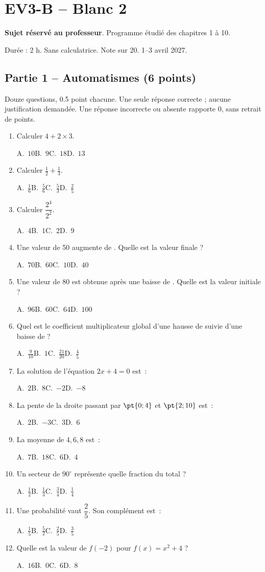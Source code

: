 \mxnewpage\section*{EV3-B -- Blanc 2}\label{EV3-B}
\textbf{Sujet réservé au professeur}. Programme étudié des chapitres 1 à 10.\par Durée : 2 h. Sans calculatrice. Note sur 20. 1–3 avril 2027.
\subsection*{Partie 1 -- Automatismes (6 points)}
Douze questions, \num{0,5} point chacune. Une seule réponse correcte ; aucune justification demandée. Une réponse incorrecte ou absente rapporte 0, sans retrait de points.
\begin{enumerate}
\item Calculer $4+2\times3$.\par A.~$10$\quad B.~$9$\quad C.~$18$\quad D.~$13$
\item Calculer $\frac12+\frac13$.\par A.~$\frac{1}{6}$\quad B.~$\frac{5}{6}$\quad C.~$\frac{5}{3}$\quad D.~$\frac{2}{5}$
\item Calculer $\dfrac{2^4}{2^{2}}$.\par A.~$4$\quad B.~$1$\quad C.~$2$\quad D.~$9$
\item Une valeur de 50 augmente de . Quelle est la valeur finale ?\par A.~$70$\quad B.~$60$\quad C.~$10$\quad D.~$40$
\item Une valeur de 80 est obtenue après une baisse de . Quelle est la valeur initiale ?\par A.~$96$\quad B.~$60$\quad C.~$64$\quad D.~$100$
\item Quel est le coefficient multiplicateur global d’une hausse de  suivie d’une baisse de  ?\par A.~$\frac{9}{10}$\quad B.~$1$\quad C.~$\frac{21}{20}$\quad D.~$\frac{4}{5}$
\item La solution de l’équation $2x+4=0$ est~:\par A.~$2$\quad B.~$8$\quad C.~$-2$\quad D.~$-8$
\item La pente de la droite passant par $\pt{0;4}$ et $\pt{2;10}$ est~:\par A.~$2$\quad B.~$-3$\quad C.~$3$\quad D.~$6$
\item La moyenne de $4, 6, 8$ est~:\par A.~$7$\quad B.~$18$\quad C.~$6$\quad D.~$4$
\item Un secteur de $90^\circ$ représente quelle fraction du total ?\par A.~$\frac{1}{2}$\quad B.~$\frac{1}{3}$\quad C.~$\frac{3}{4}$\quad D.~$\frac{1}{4}$
\item Une probabilité vaut $\dfrac{2}{5}$. Son complément est~:\par A.~$\frac{1}{5}$\quad B.~$\frac{5}{2}$\quad C.~$\frac{2}{5}$\quad D.~$\frac{3}{5}$
\item Quelle est la valeur de $f(-2)$ pour $f(x)=x^2+4$ ?\par A.~$16$\quad B.~$0$\quad C.~$6$\quad D.~$8$
\end{enumerate}
